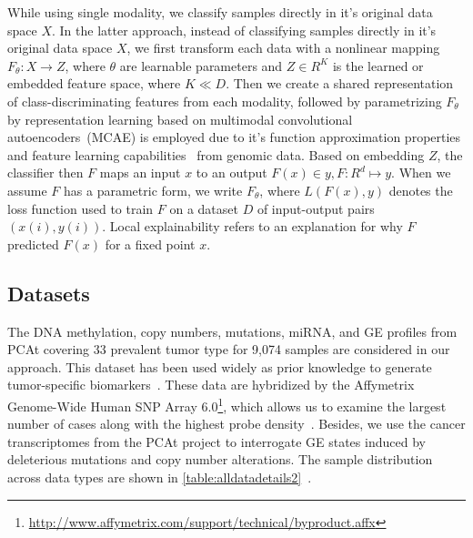 \hspace*{3.5mm} While using single modality, we classify samples directly in it's original data space $X$. In the latter approach, instead of classifying samples directly in it's original data space $X$, we first transform each data with a nonlinear mapping $F_{\theta}: X \rightarrow Z$, where $\theta$ are learnable parameters and $Z \in {R}^{K}$ is the learned or embedded feature space, where $K \ll D$. Then we create a shared representation of class-discriminating features from each modality, followed by parametrizing $F_{\theta}$ by representation learning based on multimodal convolutional autoencoders~(MCAE) is employed due to it's function approximation properties and feature learning capabilities~\cite{xie2016unsupervised,karim2019drug} from genomic data. Based on embedding $Z$, the classifier then $F$ maps an input $x$ to an output $F(x) \in y, F: {R}^{d} \mapsto y$. When we assume $F$ has a parametric form, we write $F_{\theta}$, where ${L}(F(x), y)$ denotes the loss function used to train $F$ on a dataset $D$ of input-output pairs $(x(i), y(i))$. Local explainability refers to an explanation for why $F$ predicted $F(x)$ for a fixed point $x$. 

\subsection{Datasets}
The DNA methylation, copy numbers, mutations, miRNA, and GE profiles from PCAt covering 33 prevalent tumor type for 9,074 samples are considered in our approach. This dataset has been used widely as prior knowledge to generate tumor-specific biomarkers~\cite{way2018machine,hoadley2018cell,malta2018machine}. These data are hybridized by the Affymetrix Genome-Wide Human SNP Array 6.0\footnote{\url{http://www.affymetrix.com/support/technical/byproduct.affx}}, which allows us to examine the largest number of cases along with the highest probe density~\cite{31Park}. Besides, we use the cancer transcriptomes from the PCAt project to interrogate GE states induced by deleterious mutations and copy number alterations. The sample distribution across data types are shown in \cref{table:alldatadetails2}~\cite{weinstein2013cancer}. 

